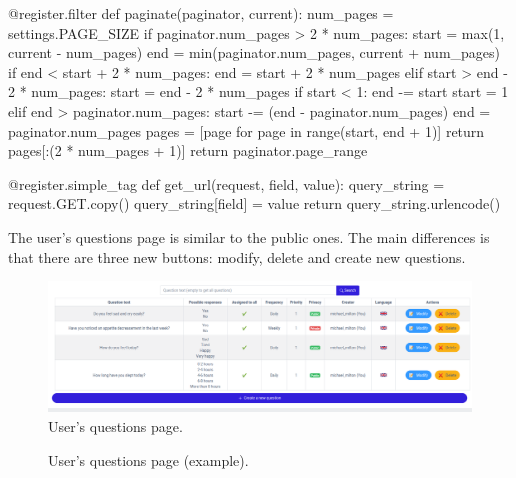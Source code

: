 \documentclass[12pt,english]{article}
\begin{document}
\begin{python}[caption={Pagination code snippets. Retrieved from \href{https://medium.com/@sumitlni/paginate-properly-please-93e7ca776432}{https://medium.com/@sumitlni/paginate-properly-please-93e7ca776432}}, captionpos=b]
@register.filter
def paginate(paginator, current):
  num_pages = settings.PAGE_SIZE
  if paginator.num_pages > 2 * num_pages:
      start = max(1, current - num_pages)
      end = min(paginator.num_pages, current + num_pages)
      if end < start + 2 * num_pages:
          end = start + 2 * num_pages
      elif start > end - 2 * num_pages:
          start = end - 2 * num_pages
      if start < 1:
          end -= start
          start = 1
      elif end > paginator.num_pages:
          start -= (end - paginator.num_pages)
          end = paginator.num_pages
      pages = [page for page in range(start, end + 1)]
      return pages[:(2 * num_pages + 1)]
  return paginator.page_range

@register.simple_tag
def get_url(request, field, value):
    query_string = request.GET.copy()
    query_string[field] = value
    return query_string.urlencode()
\end{python}



The user's questions page is similar to the public ones. The main differences is that there are three new buttons: modify, delete and create new questions.

\begin{figure}[H]
    \centering
    \includegraphics[width=\textwidth]{my_questions.png}
    \caption{User's questions page.}
\end{figure}


\begin{figure}[H]
    \caption{User's questions page (example).}
\end{figure}
\end{document}
